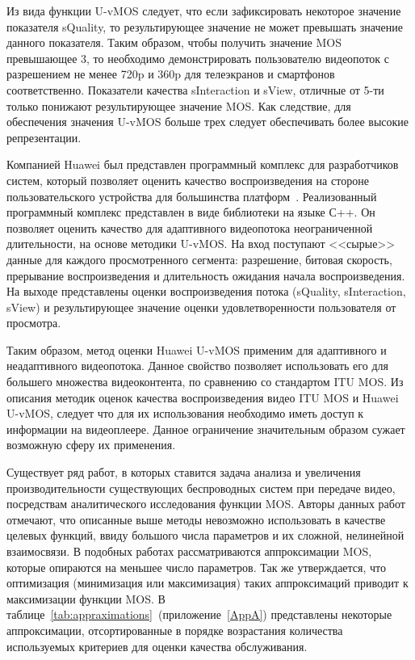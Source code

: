 Из вида функции U-vMOS следует, что если зафиксировать некоторое значение показателя sQuality, то результирующее значение не может превышать значение данного показателя. Таким образом, чтобы получить значение MOS превышающее 3, то необходимо демонстрировать пользователю видеопоток с разрешением не менее 720p и 360p для телеэкранов и смартфонов соответственно. Показатели качества sInteraction и sView, отличные от 5-ти только понижают результирующее значение MOS. Как следствие, для обеспечения значения U-vMOS больше трех следует обеспечивать более высокие репрезентации.

Компанией Huawei был представлен программный комплекс для разработчиков систем, который позволяет оценить качество воспроизведения на стороне пользовательского устройства для большинства платформ~\cite{UvMOSSdk}. Реализованный программный комплекс представлен в виде библиотеки на языке С++. Он позволяет оценить качество для адаптивного видеопотока неограниченной длительности, на основе методики U-vMOS. На вход поступают <<сырые>> данные для каждого просмотренного сегмента: разрешение, битовая скорость, прерывание воспроизведения и длительность ожидания начала воспроизведения. На выходе представлены оценки воспроизведения потока (sQuality, sInteraction, sView) и результирующее значение оценки удовлетворенности пользователя от просмотра.

Таким образом, метод оценки Huawei U-vMOS применим для адаптивного и неадаптивного видеопотока. Данное свойство позволяет использовать его для большего множества видеоконтента, по сравнению со стандартом ITU MOS. Из описания методик оценок качества воспроизведения видео ITU MOS и Huawei U-vMOS, следует что для их использования необходимо иметь доступ к информации на видеоплеере. Данное ограничение значительным образом сужает возможную сферу их применения.

Существует ряд работ, в которых ставится задача анализа и увеличения производительности существующих беспроводных систем при передаче видео, посредствам аналитического исследования функции MOS. Авторы данных работ отмечают, что описанные выше методы невозможно использовать в качестве целевых функций, ввиду большого числа параметров и их сложной, нелинейной взаимосвязи. В подобных работах рассматриваются аппроксимации MOS, которые опираются на меньшее число параметров. Так же утверждается, что оптимизация (минимизация или максимизация) таких аппроксимаций приводит к максимизации функции MOS. В таблице~\ref{tab:appraximations}~(приложение~\ref{AppA}) представлены некоторые аппроксимации, отсортированные в порядке возрастания количества используемых критериев для оценки качества обслуживания.

